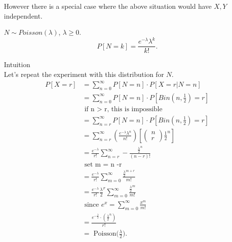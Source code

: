 \documentclass[a4paper]{article}
\begin{document}
\begin{remark}
  However there is a special case where the above situation would have $X,Y$ independent.
\end{remark}

\begin{definition}
  $N \sim Poisson(\lambda)$,  $\lambda \geq 0$.
   \[
     P[N=k] = \frac{e^{-\lambda}\lambda^{k}}{k!}
  .\] 
\end{definition}

\begin{remark}{Intuition}\\
Let's repeat the experiment with this distribution for $N$.
\begin{align*}
  P[X=r] &= \sum_{n=0}^{\infty} P[N=n] \cdot P[X=r|N=n] \\
         &= \sum_{n=0}^{\infty} P[N=n] \cdot P[Bin(n,\frac{1}{2})=r] \\
         & \text{ if n > r, this is impossible} \\
         &= \sum_{n=r}^{\infty} P[N=n] \cdot P[Bin(n, \frac{1}{2}) = r] \\
         &= \sum_{n=r}^{\infty} (\frac{e^{-\lambda} \lambda^{n}}{n!}) [\begin{pmatrix} n \\ r \end{pmatrix} \frac{1}{2}^{n}] \\
         &= \frac{e^{-\lambda}}{r!} \sum_{n=r}^{\infty} - \frac{\frac{\lambda}{2}^{n}}{(n-r)!} \\
         &\text{ set m = n -r} \\
         &=  \frac{e^{-\lambda}}{r!} \sum_{m=0}^{\infty} \frac{\frac{\lambda}{2}^{m+r}}{m!} \\
         &=   \frac{e^{-\lambda}}{r!} \frac{\lambda}{2}^r \sum_{m=0}^{\infty} \frac{\frac{\lambda}{2}^{m}}{m!}  \\
         &\text{ since $e^{x} = \sum_{m=0}^{\infty} \frac{x^{m}}{m!}$ } \\
         &= \frac{e^{-\frac{\lambda}{2}} \cdot \left( \frac{\lambda}{2}^{n} \right) }{r!} \\
         &=\text{ Poisson($\frac{\lambda}{2})$}
.\end{align*}


\end{remark}
\end{document}
